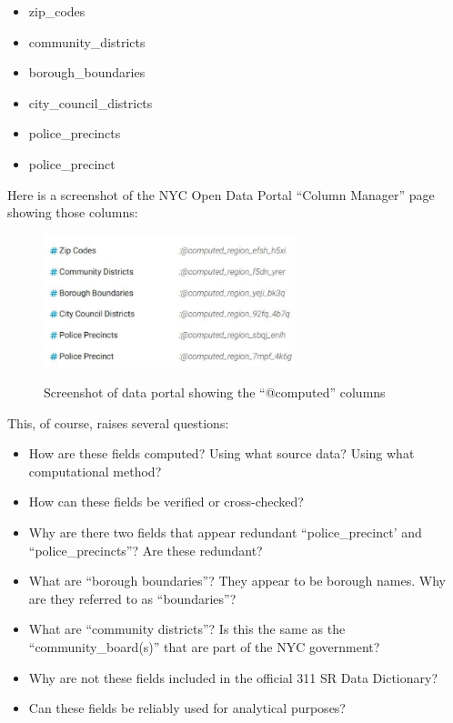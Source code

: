 \documentclass[12pt, titlepage]{article}
\begin{document}
\begin{itemize}
	\item zip\_codes
	\item community\_districts
	\item borough\_boundaries
	\item city\_council\_districts
	\item police\_precincts
	\item police\_precinct 
\end{itemize}	

Here is a screenshot of the NYC Open Data Portal ``Column Manager'' page showing those columns:

\begin{figure}[tbp]
  \centering
  \caption{Screenshot of data portal showing the ``@computed'' columns}
	  \includegraphics[width = 0.65\textwidth] {computed_columns_screenshot.pdf}	  
	  \label{fig:computed-columns}
\end{figure}

This, of course, raises several questions:

\begin{itemize}
	\item How are these fields computed? Using what source data? Using what computational method?
	\item How can these fields be verified or cross-checked?
	\item Why are there two fields that appear redundant ``police\_precinct' and ``police\_precincts''? Are these redundant?
	\item What are ``borough boundaries''? They appear to be borough names. Why are they referred to as ``boundaries''?
	\item What are ``community districts''? Is this the same as the ``community\_board(s)'' that are part of the NYC government?
	\item Why are not these fields included in the official 311 SR Data Dictionary?
	\item Can these fields be reliably used for analytical purposes? 
\end{itemize}	
\end{document}
